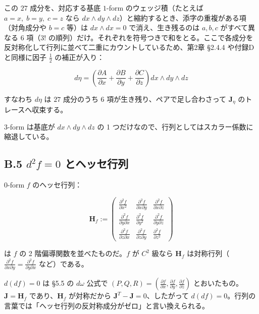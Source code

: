 \documentclass[a4paper,12pt,openany]{book}
\begin{document}
この \(27\) 成分を、対応する基底 \(1\)-form のウェッジ積（たとえば
\(a=x,\;b=y,\;c=z\) なら
\(dx \wedge dy \wedge dz\)）と縮約するとき、添字の重複がある項（対角成分や
\(b=c\) 等）は \(dx \wedge dx = 0\) で消え、生き残るのは \(a,b,c\)
がすべて異なる \(6\) 項（\(3!\)
の順列）だけ。それぞれを符号つきで和をとる。ここで各成分を反対称化して行列に並べて二重にカウントしているため、第2章
§2.4.4 や付録Dと同様に因子 \(\frac{1}{2}\) の補正が入り：

\[d\eta = \left( \frac{\partial A}{\partial x} + \frac{\partial B}{\partial y} + \frac{\partial C}{\partial z} \right) dx \wedge dy \wedge dz\]

すなわち \(d\eta\) は \(27\) 成分のうち \(6\)
項が生き残り、ペアで足し合わさって \(\mathbf{J}_\eta\)
のトレースへ収束する。

\(3\)-form は基底が \(dx \wedge dy \wedge dz\) の 1
つだけなので、行列としてはスカラー係数に縮退している。

\hypertarget{b.5-d2-f-0-ux3068ux30d8ux30c3ux30bbux884cux5217}{%
\subsection*{\texorpdfstring{B.5 \(d^2 f = 0\)
とヘッセ行列}{B.5 d\^{}2 f = 0 とヘッセ行列}}\label{b.5-d2-f-0-ux3068ux30d8ux30c3ux30bbux884cux5217}}

\(0\)-form \(f\) のヘッセ行列：

\[\mathbf{H}_f := \begin{pmatrix}
\frac{\partial^2 f}{\partial x^2} & \frac{\partial^2 f}{\partial x \partial y} & \frac{\partial^2 f}{\partial x \partial z} \\
\frac{\partial^2 f}{\partial y \partial x} & \frac{\partial^2 f}{\partial y^2} & \frac{\partial^2 f}{\partial y \partial z} \\
\frac{\partial^2 f}{\partial z \partial x} & \frac{\partial^2 f}{\partial z \partial y} & \frac{\partial^2 f}{\partial z^2}
\end{pmatrix}\]

は \(f\) の 2 階偏導関数を並べたものだ。\(f\) が \(C^2\) 級なら
\(\mathbf{H}_f\)
は対称行列（\(\frac{\partial^2 f}{\partial x \partial y} = \frac{\partial^2 f}{\partial y \partial x}\)
など）である。

\(d(df) = 0\) は §5.5 の \(d\omega\) 公式で
\((P,Q,R) = (\frac{\partial f}{\partial x}, \frac{\partial f}{\partial y}, \frac{\partial f}{\partial z})\)
とおいたもの。\(\mathbf{J} = \mathbf{H}_f\) であり、\(\mathbf{H}_f\)
が対称だから \(\mathbf{J}^T - \mathbf{J} = 0\)、したがって
\(d(df) = 0\)。行列の言葉では「ヘッセ行列の反対称成分がゼロ」と言い換えられる。
\end{document}
